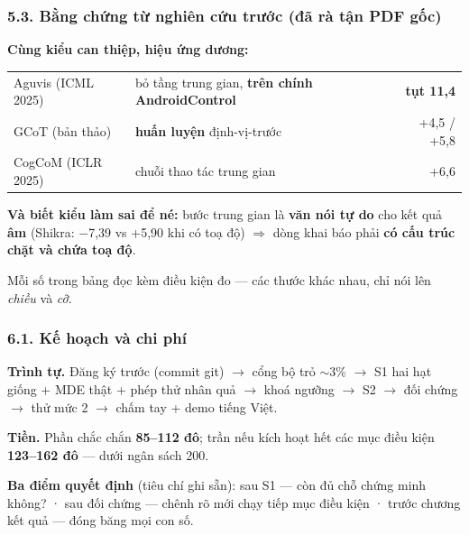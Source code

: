 \documentclass[10pt]{beamer}
\newcommand{\dn}[1]{{\color{dnteal}\textbf{#1}}}
\newcommand{\vd}[1]{{\color{vdblue}\textbf{#1}}}
\newcommand{\ann}[1]{{\color{annmar}\textbf{#1}}}
\newcommand{\nv}[1]{{\color{daunavy}\textbf{#1}}}
\begin{document}
\begin{frame}
  \frametitle{5.3. Bằng chứng từ nghiên cứu trước (đã rà tận PDF gốc)}
  \begin{block}{}
    \dn{Cùng kiểu can thiệp, hiệu ứng dương:}\par\smallskip
    {\centering\footnotesize
    \begin{tabular}{l p{} r}
      Aguvis (ICML 2025) & bỏ tầng trung gian, \nv{trên chính AndroidControl} & \ann{tụt 11,4}\\[0.35ex]
      GCoT (bản thảo) & \nv{huấn luyện} định-vị-trước & +4,5 / +5,8\\[0.35ex]
      CogCoM (ICLR 2025) & chuỗi thao tác trung gian & +6,6\\
    \end{tabular}\par}
  \end{block}
  \begin{block}{}
    \vd{Và biết kiểu làm sai để né:} bước trung gian là \nv{văn nói tự do} cho kết quả \ann{âm} (Shikra: $-$7,39 vs +5,90 khi có toạ độ) \(\Rightarrow\) dòng khai báo phải \nv{có cấu trúc chặt và chứa toạ độ}.
  \end{block}
  {\small Mỗi số trong bảng đọc kèm điều kiện đo --- các thước khác nhau, chỉ nói lên \textit{chiều} và \textit{cỡ}.}
\end{frame}

\begin{frame}
  \frametitle{6.1. Kế hoạch và chi phí}
  \begin{block}{}
    \dn{Trình tự.} Đăng ký trước (commit git) \(\rightarrow\) cổng bộ trỏ \(\sim\)3\% \(\rightarrow\) S1 hai hạt giống + MDE thật + phép thử nhân quả \(\rightarrow\) khoá ngưỡng \(\rightarrow\) S2 \(\rightarrow\) đối chứng \(\rightarrow\) thử mức 2 \(\rightarrow\) chấm tay + demo tiếng Việt.
  \end{block}
  \begin{block}{}
    \vd{Tiền.} Phần chắc chắn \nv{85--112 đô}; trần nếu kích hoạt hết các mục điều kiện \nv{123--162 đô} --- dưới ngân sách 200.
  \end{block}
  \vspace{0.4ex}
  \dn{Ba điểm quyết định} (tiêu chí ghi sẵn): sau S1 --- còn đủ chỗ chứng minh không? · sau đối chứng --- chênh rõ mới chạy tiếp mục điều kiện · trước chương kết quả --- đóng băng mọi con số.
\end{frame}
\end{document}
